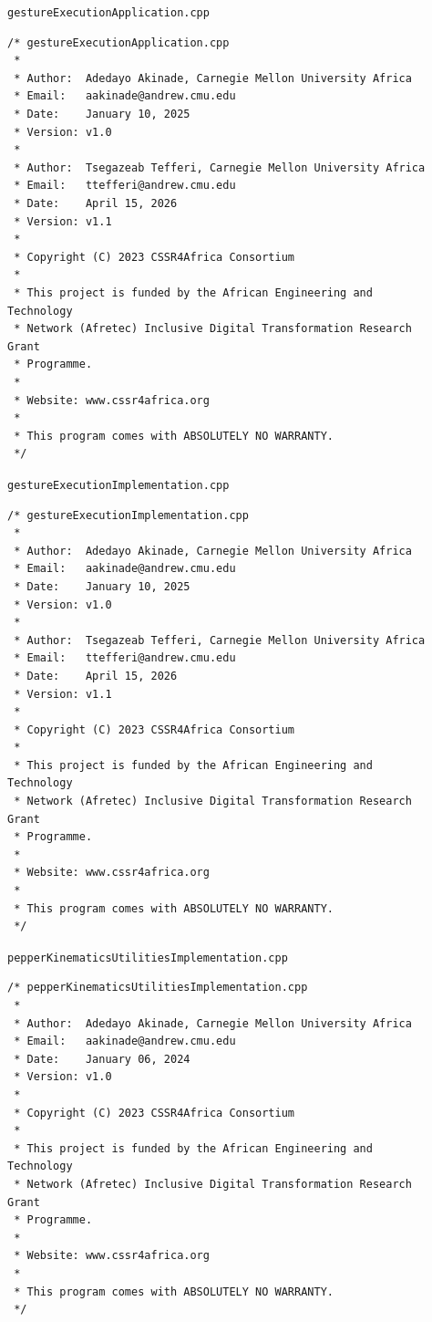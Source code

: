 \documentclass{CSSRforAfrica}
\newcommand{\checkboxChecked}{\fbox{\ding{51}}} %
\begin{document}
\begin{description}

\item[\checkboxChecked] {\small \verb+gestureExecutionApplication.cpp+}  
{\small \begin{verbatim}
/* gestureExecutionApplication.cpp
 *
 * Author:  Adedayo Akinade, Carnegie Mellon University Africa
 * Email:   aakinade@andrew.cmu.edu
 * Date:    January 10, 2025
 * Version: v1.0
 *
 * Author:  Tsegazeab Tefferi, Carnegie Mellon University Africa
 * Email:   ttefferi@andrew.cmu.edu
 * Date:    April 15, 2026
 * Version: v1.1
 *
 * Copyright (C) 2023 CSSR4Africa Consortium
 *
 * This project is funded by the African Engineering and Technology
 * Network (Afretec) Inclusive Digital Transformation Research Grant
 * Programme.
 *
 * Website: www.cssr4africa.org
 *
 * This program comes with ABSOLUTELY NO WARRANTY.
 */
\end{verbatim} }

\item[\checkboxChecked]  {\small \verb+gestureExecutionImplementation.cpp+}  
{\small \begin{verbatim}
/* gestureExecutionImplementation.cpp
 *
 * Author:  Adedayo Akinade, Carnegie Mellon University Africa
 * Email:   aakinade@andrew.cmu.edu
 * Date:    January 10, 2025
 * Version: v1.0
 *
 * Author:  Tsegazeab Tefferi, Carnegie Mellon University Africa
 * Email:   ttefferi@andrew.cmu.edu
 * Date:    April 15, 2026
 * Version: v1.1
 *
 * Copyright (C) 2023 CSSR4Africa Consortium
 *
 * This project is funded by the African Engineering and Technology
 * Network (Afretec) Inclusive Digital Transformation Research Grant
 * Programme.
 *
 * Website: www.cssr4africa.org
 *
 * This program comes with ABSOLUTELY NO WARRANTY.
 */
\end{verbatim} }

\item[\checkboxChecked]  {\small \verb+pepperKinematicsUtilitiesImplementation.cpp+}  
{\small \begin{verbatim}
/* pepperKinematicsUtilitiesImplementation.cpp
 *
 * Author:  Adedayo Akinade, Carnegie Mellon University Africa
 * Email:   aakinade@andrew.cmu.edu
 * Date:    January 06, 2024
 * Version: v1.0
 *
 * Copyright (C) 2023 CSSR4Africa Consortium
 *
 * This project is funded by the African Engineering and Technology
 * Network (Afretec) Inclusive Digital Transformation Research Grant
 * Programme.
 *
 * Website: www.cssr4africa.org
 *
 * This program comes with ABSOLUTELY NO WARRANTY.
 */
\end{verbatim} }


\end{description}
\end{document}
